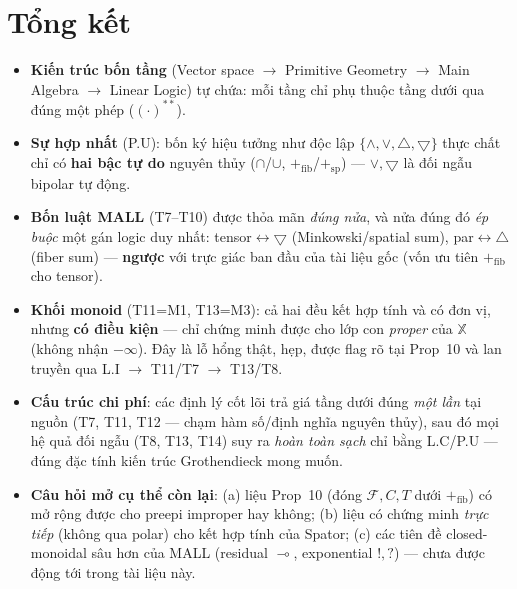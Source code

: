 \documentclass[11pt]{article}
\theoremstyle{plainlabel}
\begin{document}
\section{Tổng kết}

\begin{itemize}
\item \textbf{Kiến trúc bốn tầng} (Vector space $\to$ Primitive Geometry $\to$ Main Algebra $\to$ Linear Logic) tự chứa: mỗi tầng chỉ phụ thuộc tầng dưới qua đúng một phép ($(\cdot)^{**}$).

\item \textbf{Sự hợp nhất} (P.U): bốn ký hiệu tưởng như độc lập $\{\wedge,\vee,\triangle,\bigtriangledown\}$ thực chất chỉ có \textbf{hai bậc tự do} nguyên thủy ($\cap$/$\cup$, $+_{\mathrm{fib}}$/$+_{\mathrm{sp}}$) — $\vee,\bigtriangledown$ là đối ngẫu bipolar tự động.

\item \textbf{Bốn luật MALL} (T7--T10) được thỏa mãn \emph{đúng nửa}, và nửa đúng đó \emph{ép buộc} một gán logic duy nhất: tensor$\leftrightarrow\bigtriangledown$ (Minkowski/spatial sum), par$\leftrightarrow\triangle$ (fiber sum) — \textbf{ngược} với trực giác ban đầu của tài liệu gốc (vốn ưu tiên $+_{\mathrm{fib}}$ cho tensor).

\item \textbf{Khối monoid} (T11=M1, T13=M3): cả hai đều kết hợp tính và có đơn vị, nhưng \textbf{có điều kiện} — chỉ chứng minh được cho lớp con \emph{proper} của $\mathbb X$ (không nhận $-\infty$). Đây là lỗ hổng thật, hẹp, được flag rõ tại Prop~10 và lan truyền qua L.I $\to$ T11/T7 $\to$ T13/T8.

\item \textbf{Cấu trúc chi phí}: các định lý cốt lõi trả giá tầng dưới đúng \emph{một lần} tại nguồn (T7, T11, T12 — chạm hàm số/định nghĩa nguyên thủy), sau đó mọi hệ quả đối ngẫu (T8, T13, T14) suy ra \emph{hoàn toàn sạch} chỉ bằng L.C/P.U — đúng đặc tính kiến trúc Grothendieck mong muốn.

\item \textbf{Câu hỏi mở cụ thể còn lại}: (a) liệu Prop~10 (đóng $\mathcal F,C,T$ dưới $+_{\mathrm{fib}}$) có mở rộng được cho preepi improper hay không; (b) liệu có chứng minh \emph{trực tiếp} (không qua polar) cho kết hợp tính của Spator; (c) các tiên đề closed-monoidal sâu hơn của MALL (residual $\multimap$, exponential $!,?$) — chưa được động tới trong tài liệu này.
\end{itemize}
\end{document}
